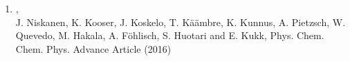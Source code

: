 \documentclass[12pt,a4]{report}
\begin{document}
\begin{enumerate}
\item{},\\
J. Niskanen, K. Kooser, J. Koskelo, T. K{\"a}{\"a}mbre, K. Kunnus, A. Pietzsch, W. Quevedo, M. Hakala, A. F{\"o}hlisch, S. Huotari and E. Kukk, Phys. Chem. Chem. Phys. Advance Article (2016)
  






















\end{enumerate}

\vspace{0.4cm}

\end{document}
